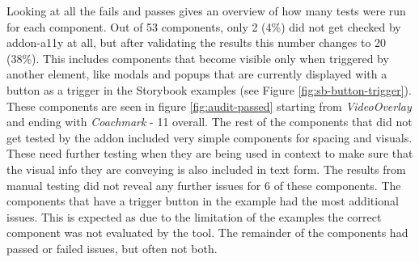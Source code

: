 \documentclass{master_thesis}
\begin{document}
Looking at all the fails and passes gives an overview of how many tests were run for each component. Out of 53 components, only 2 (4\%) did not get checked by addon-a11y at all, but after validating the results this number changes to 20 (38\%). This includes components that become visible only when triggered by another element, like modals and popups that are currently displayed with a button as a trigger in the Storybook examples (see Figure \ref{fig:sb-button-trigger}). These components are seen in figure \ref{fig:audit-passed} starting from \textit{VideoOverlay} and ending with \textit{Coachmark} - 11 overall. The rest of the components that did not get tested by the addon included very simple components for spacing and visuals. These need further testing when they are being used in context to make sure that the visual info they are conveying is also included in text form. The results from manual testing did not reveal any further issues for 6 of these components. The components that have a trigger button in the example had the most additional issues. This is expected as due to the limitation of the examples the correct component was not evaluated by the tool. The remainder of the components had passed or failed issues, but often not both.
\end{document}
